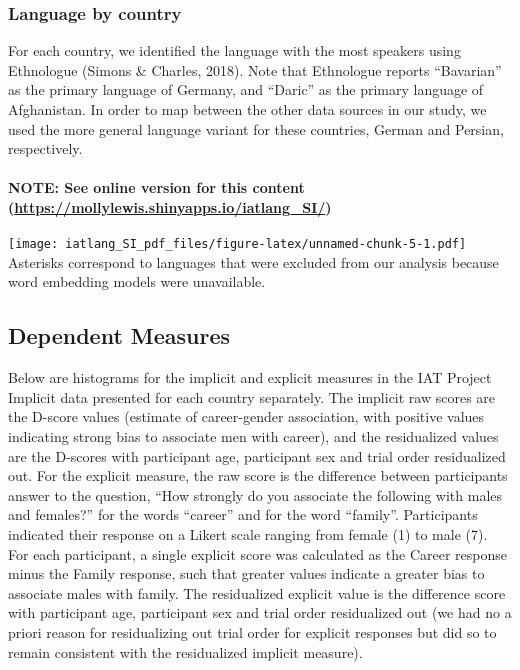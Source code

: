\documentclass[]{article}
\let\oldparagraph\paragraph
\renewcommand{\paragraph}[1]{\oldparagraph{#1}\mbox{}}
\begin{document}
\hypertarget{language-by-country}{%
\subsubsection{Language by country}\label{language-by-country}}

For each country, we identified the language with the most speakers
using Ethnologue (Simons \& Charles, 2018). Note that Ethnologue reports
``Bavarian'' as the primary language of Germany, and ``Daric'' as the
primary language of Afghanistan. In order to map between the other data
sources in our study, we used the more general language variant for
these countries, German and Persian, respectively.

\hypertarget{note-see-online-version-for-this-content-httpsmollylewis.shinyapps.ioiatlang_si}{%
\paragraph{\texorpdfstring{NOTE: See online version for this content
(\url{https://mollylewis.shinyapps.io/iatlang_SI/})}{NOTE: See online version for this content (https://mollylewis.shinyapps.io/iatlang\_SI/)}}\label{note-see-online-version-for-this-content-httpsmollylewis.shinyapps.ioiatlang_si}}

\texttt{[image: iatlang\_SI\_pdf\_files/figure-latex/unnamed-chunk-5-1.pdf]}
Asterisks correspond to languages that were excluded from our analysis
because word embedding models were unavailable.

\hypertarget{dependent-measures}{%
\subsection{Dependent Measures}\label{dependent-measures}}

Below are histograms for the implicit and explicit measures in the IAT
Project Implicit data presented for each country separately. The
implicit raw scores are the D-score values (estimate of career-gender
association, with positive values indicating strong bias to associate
men with career), and the residualized values are the D-scores with
participant age, participant sex and trial order residualized out. For
the explicit measure, the raw score is the difference between
participants answer to the question, ``How strongly do you associate the
following with males and females?'' for the words ``career'' and for the
word ``family''. Participants indicated their response on a Likert scale
ranging from female (1) to male (7). For each participant, a single
explicit score was calculated as the Career response minus the Family
response, such that greater values indicate a greater bias to associate
males with family. The residualized explicit value is the difference
score with participant age, participant sex and trial order residualized
out (we had no a priori reason for residualizing out trial order for
explicit responses but did so to remain consistent with the residualized
implicit measure).
\end{document}
